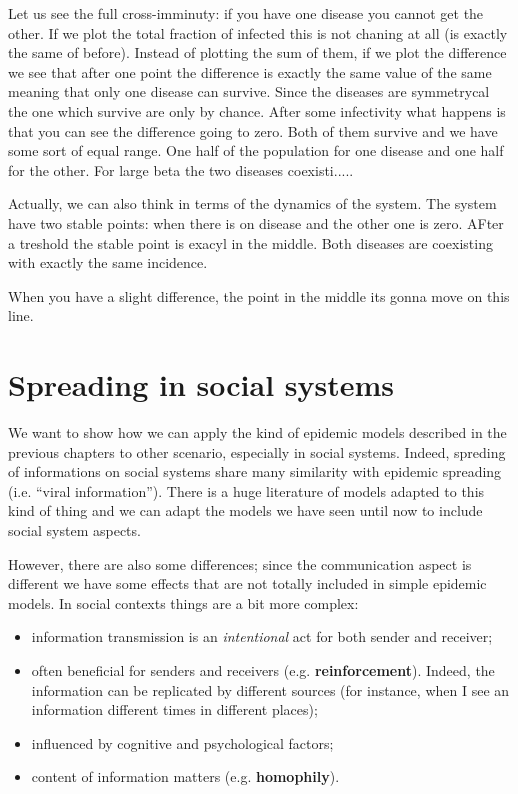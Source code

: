 \documentclass[../main/main.tex]{subfiles}
\begin{document}
Let us see the full cross-imminuty: if you have one disease you cannot get the other. If we plot the total fraction of infected this is not chaning at all (is exactly the same of before). Instead of plotting the sum of them, if  we plot the difference we see that after one point the difference is exactly the same value of the same meaning that only one disease can survive. Since the diseases are symmetrycal the one which survive are only by chance. After some infectivity what happens is that you can see the difference going to zero. Both of them survive and we have some sort of equal range. One half of the population for one disease and one half for the other. For large beta the two diseases coexisti.....

Actually, we can also think in terms of the dynamics of the system. The system have two stable points: when there is on disease and the other one is zero. AFter a treshold the stable point is exacyl in the middle. Both diseases are coexisting with exactly the same incidence.

When you have a slight difference, the point in the middle its gonna move on this line.


\chapter{Spreading in social systems}

We want to show how we can apply the kind of epidemic models described in the previous chapters to other scenario, especially in social systems.
Indeed, spreding of informations on social systems share many similarity with epidemic spreading (i.e. “viral information”). There is a huge literature of models adapted to this kind of thing and we can adapt the models we have seen until now to include social system aspects.

However, there are also some differences; since the communication aspect is different we have some effects that are not totally included in simple epidemic models. In social contexts things are a bit more complex:
\begin{itemize}
\item information transmission is an \emph{intentional} act for both sender and receiver;

\item often beneficial for senders and receivers (e.g. \textbf{reinforcement}). Indeed, the information can be replicated by different sources (for instance, when I see an information different times in different places);

\item influenced by cognitive and psychological factors;

\item content of information matters (e.g. \textbf{homophily}).

\end{itemize}
\end{document}
